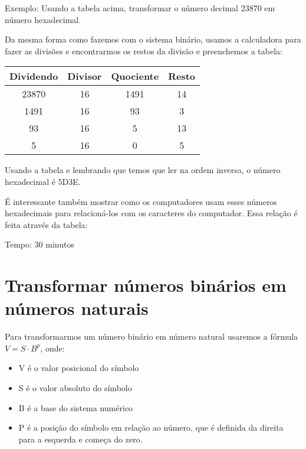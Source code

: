 \documentclass[12pt, openright, a4paper, brazil, openany, oneside]{abntex2}
\begin{document}
Exemplo: Usando a tabela acima, transformar o número decimal 23870 em número hexadecimal.

Da mesma forma como fazemos com o sistema binário, usamos a calculadora para fazer as divisões e encontrarmos os restos da divisão e preenchemos a tabela:

 \begin{table}[h]
        \centering
        \begin{tabular}{|c|c|c|c|}
            \hline
            Dividendo & Divisor & Quociente & Resto \\
            \hline
            23870 & 16 & 1491 & 14 \\
            \hline
            1491 & 16 & 93 & 3 \\
            \hline
            93 & 16 & 5 & 13 \\
            \hline
            5 & 16 & 0 & 5 \\
            \hline
        \end{tabular}
    \end{table}

Usando a tabela e lembrando que temos que ler na ordem inversa, o número hexadecimal é 5D3E.


É interessante também mostrar como os computadores usam esses números hexadecimais para relacioná-los com os caracteres do computador. Essa relação é feita através da tabela:

\begin{figure}[h]

    \center


\end{figure}


Tempo: 30 minutos



\section{Transformar números binários em números naturais}

Para transformarmos um número binário em número natural usaremos a fórmula $ V=S \cdot B^p $, onde:

\begin{itemize}
    \item V é o valor posicional do símbolo
    \item S é o valor absoluto do símbolo
    \item B é a base do sistema numérico
    \item P é a posição do símbolo em relação ao número, que é definida da direita para a esquerda e começa do zero.
\end{itemize}
\end{document}
